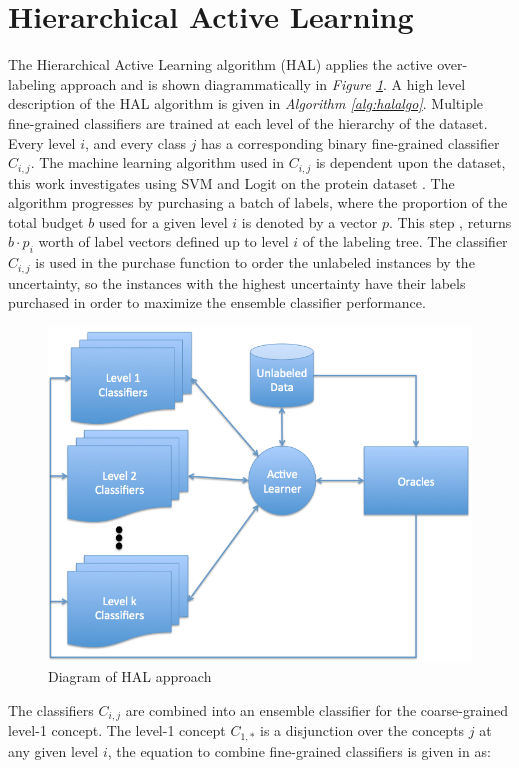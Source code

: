\documentclass[ms]{nuthesis}
\begin{document}
\section{Hierarchical Active Learning}
\label{sect:HAL}
\par The Hierarchical Active Learning algorithm (HAL) applies the active over-labeling
approach and is shown diagrammatically in \textit{Figure \ref{fig:HALapproach}}.
A high level description of the HAL algorithm is given in
\textit{Algorithm \ref{alg:halalgo}}.
Multiple fine-grained classifiers are trained at each level of the hierarchy of the dataset.
 Every level $i$, and every class $j$ has a corresponding binary fine-grained
 classifier $C_{i,j}$. The machine learning algorithm used in $C_{i,j}$ is
 dependent upon the dataset, this work investigates using SVM and Logit
 on the protein dataset \cite{bioPoster}. The algorithm progresses by
 purchasing a batch of labels, where the proportion of the total budget $b$
 used for a given level $i$ is denoted by a vector $p$. This step
 , returns $b \cdot p_i$ worth
  of label vectors defined up to level $i$ of the labeling tree. The
  classifier $C_{i,j}$ is used in the purchase function to order the
  unlabeled instances by the uncertainty, so the instances with the
  highest uncertainty have their labels purchased in order to maximize
  the ensemble classifier performance.

\FloatBarrier
\begin{figure}[!htb]
	\centering
    \includegraphics[width=0.65\columnwidth]{fig/AL2}
    \caption{Diagram of HAL approach}
    \label{fig:HALapproach}
\end{figure}
\FloatBarrier





The classifiers $C_{i,j}$ are combined into an ensemble classifier for
the coarse-grained level-1 concept. The level-1 concept $C_{1,*}$ is a
disjunction over
the concepts $j$ at any given level $i$, the equation to combine fine-grained
classifiers is given in as: %
\end{document}
